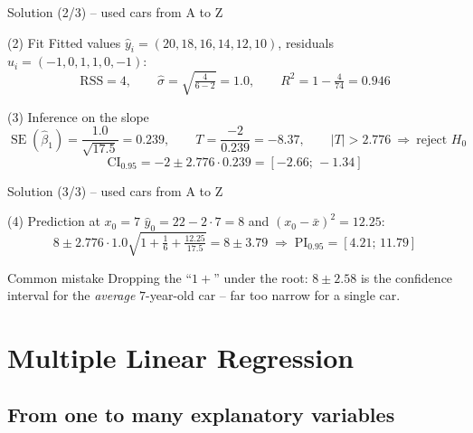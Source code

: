 \documentclass[aspectratio=169,11pt]{beamer}
\begin{document}
\begin{frame}{Solution (2/3) -- used cars from A to Z}
  \begin{exampleblock}{(2) Fit}
    Fitted values $\hat y_i=(20,18,16,14,12,10)$, residuals
    $\hat u_i=(-1,0,1,1,0,-1)$:
    \[
      \text{RSS}=4,\qquad
      \hat\sigma=\sqrt{\tfrac{4}{6-2}}=1.0,\qquad
      R^2=1-\tfrac{4}{74}=0.946
    \]
  \end{exampleblock}
  \begin{exampleblock}{(3) Inference on the slope}
    \[
      \operatorname{SE}(\hat\beta_1)=\frac{1.0}{\sqrt{17.5}}=0.239,\qquad
      T=\frac{-2}{0.239}=-8.37,\qquad |T|>2.776\ \Rightarrow\ \text{reject }H_0
    \]
    \[
      \text{CI}_{0.95}=-2\pm2.776\cdot0.239=[-2.66;\,-1.34]
    \]
  \end{exampleblock}
\end{frame}

\begin{frame}{Solution (3/3) -- used cars from A to Z}
  \begin{exampleblock}{(4) Prediction at $x_0=7$}
    $\hat y_0=22-2\cdot7=8$ and $(x_0-\bar x)^2=12.25$:
    \[
      8\pm2.776\cdot1.0\sqrt{1+\tfrac16+\tfrac{12.25}{17.5}}
      =8\pm3.79
      \;\Rightarrow\; \text{PI}_{0.95}=[4.21;\,11.79]
    \]
  \end{exampleblock}
  \begin{alertblock}{Common mistake}
    Dropping the ``$1+$'' under the root: $8\pm2.58$ is the confidence
    interval for the \emph{average} $7$-year-old car -- far too narrow for a
    single car.
  \end{alertblock}
\end{frame}

\section[Multiple regression]{Multiple Linear Regression}

\subsection{From one to many explanatory variables}
\end{document}
